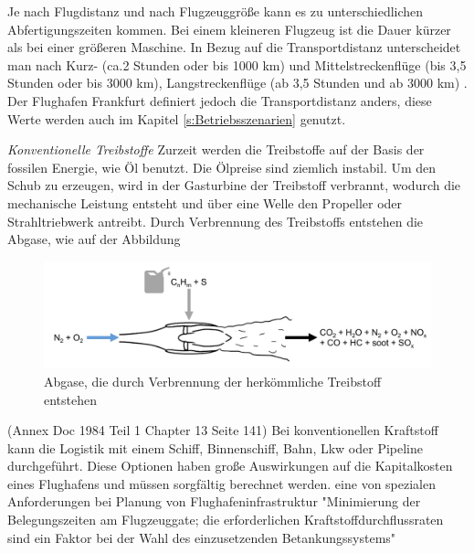 Je nach Flugdistanz und nach Flugzeuggröße kann es zu unterschiedlichen Abfertigungszeiten kommen. Bei einem kleineren Flugzeug ist die Dauer 
kürzer als bei einer größeren Maschine. 
In Bezug auf die Transportdistanz unterscheidet man nach Kurz- (ca.2 Stunden oder bis 1000 km) 
und Mittelstreckenflüge (bis 3,5 Stunden oder bis 3000 km), Langstreckenflüge (ab 3,5 Stunden und ab 3000 km) \cite{mensen2013handbuch}.
Der Flughafen Frankfurt definiert jedoch die Transportdistanz anders, diese Werte werden auch im Kapitel \ref{s:Betriebsszenarien} genutzt.

\textit{Konventionelle Treibstoffe}
Zurzeit werden die Treibstoffe auf der Basis der fossilen Energie, wie Öl benutzt. Die Ölpreise sind ziemlich instabil. %
Um den Schub zu erzeugen, wird in der Gasturbine der Treibstoff verbrannt, wodurch die mechanische Leistung entsteht 
und über eine Welle den Propeller oder Strahltriebwerk antreibt. Durch Verbrennung des Treibstoffs entstehen die Abgase, wie auf der Abbildung
\begin{figure}[h]
	\centering
	\includegraphics[width=0.8\linewidth]{Bilder/Abgase.png}
	\caption[Abfertigung]{Abgase, die durch Verbrennung der herkömmliche Treibstoff entstehen}
	\label{abfertigung}
\end{figure}


(Annex  Doc 1984 Teil 1 Chapter 13 Seite 141)
Bei konventionellen Kraftstoff kann die Logistik mit einem Schiff, Binnenschiff, Bahn, Lkw oder Pipeline durchgeführt. 
Diese Optionen haben große Auswirkungen auf die Kapitalkosten eines Flughafens und müssen sorgfältig berechnet werden. 
eine von spezialen Anforderungen bei Planung von Flughafeninfrastruktur "Minimierung der Belegungszeiten am Flugzeuggate; 
die erforderlichen Kraftstoffdurchflussraten sind ein Faktor bei der Wahl des einzusetzenden Betankungssystems"